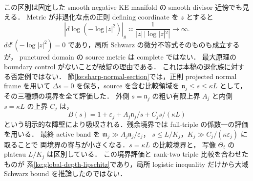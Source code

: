 この区別は固定した smooth negative KE manifold の smooth divisor 近傍でも見える．
Metric が非退化な点の正則 defining coordinate を $z$ とすると
\[
 |d\log(-\log|z|^2)|_g
 \asymp\frac{1}{|z|\,|\log|z|^2|}\longrightarrow\infty.
\]
$dd^c(-\log|z|^2)=0$ であり，局所 Schwarz の微分不等式そのものも成立するが，
punctured domain の source metric は complete ではない．
最大原理の boundary control がないことが破綻の理由である．
これは本稿の退化族に対する否定例ではない．
節\ref{ke:sharp-normal-section}では，正則 projected normal frame を用いて
$\Delta s=0$ を保ち，source を含む比較領域を
$\mathfrak n_j\le s\le\kappa L$ として，その三種類の境界を全て評価した．
外側 $s=\mathfrak n_j$ の粗い有限上界 $A_j$ と内側 $s=\kappa L$ の上界 $C_j$ は，
\[
 B(s)=1+\varepsilon_j+A_j\mathfrak n_j/s+C_js/(\kappa L)
\]
という明示的な障壁により吸収される．残余境界では
full-triple の係数一の評価を用いる．
最終 active band を
$\mathfrak m_j\gg A_j\mathfrak n_j/\varepsilon_j$，
$s\le L/K_j$，$K_j\gg C_j/(\kappa\varepsilon_j)$ に取ることで
両境界の寄与が小さくなる．$s=\kappa L$ の比較境界と，
写像 $\Theta_t$ の plateau $L/K_j$ は区別している．
この境界評価と rank-two triple 比較を合わせたものが
系\ref{ke:global-depth-lipschitz}であり，局所 logistic inequality
だけから大域 Schwarz bound を推論したのではない．
